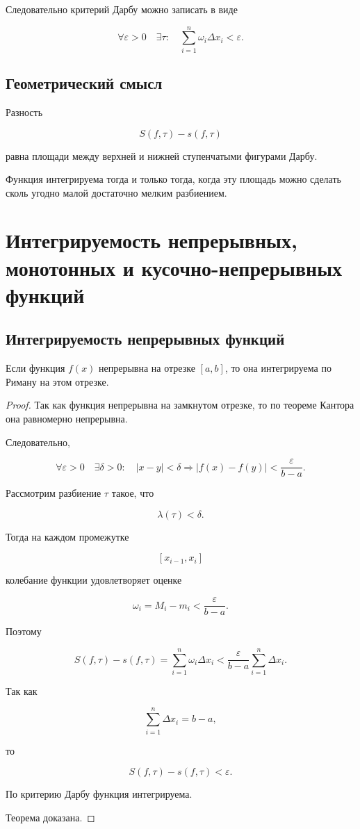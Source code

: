 \documentclass[14pt]{extreport}
\begin{document}
Следовательно критерий Дарбу можно записать в виде

\[
\forall\varepsilon>0
\quad
\exists\tau:
\quad
\sum_{i=1}^{n}
\omega_i\Delta x_i
<
\varepsilon.
\]

\section{Геометрический смысл}

Разность

\[
S(f,\tau)-s(f,\tau)
\]

равна площади между верхней и нижней ступенчатыми фигурами Дарбу.

Функция интегрируема тогда и только тогда,
когда эту площадь можно сделать сколь угодно малой
достаточно мелким разбиением.

\chapter{Интегрируемость непрерывных, монотонных и кусочно-непрерывных функций}

\section{Интегрируемость непрерывных функций}

\begin{theorem}
Если функция $f(x)$ непрерывна на отрезке $[a,b]$,
то она интегрируема по Риману на этом отрезке.
\end{theorem}

\begin{proof}

Так как функция непрерывна на замкнутом отрезке,
то по теореме Кантора она равномерно непрерывна.

Следовательно,

\[
\forall\varepsilon>0
\quad
\exists\delta>0:
\quad
|x-y|<\delta
\Rightarrow
|f(x)-f(y)|
<
\frac{\varepsilon}{b-a}.
\]

Рассмотрим разбиение $\tau$ такое, что

\[
\lambda(\tau)<\delta.
\]

Тогда на каждом промежутке

\[
[x_{i-1},x_i]
\]

колебание функции удовлетворяет оценке

\[
\omega_i
=
M_i-m_i
<
\frac{\varepsilon}{b-a}.
\]

Поэтому

\[
S(f,\tau)-s(f,\tau)
=
\sum_{i=1}^{n}
\omega_i\Delta x_i
<
\frac{\varepsilon}{b-a}
\sum_{i=1}^{n}\Delta x_i.
\]

Так как

\[
\sum_{i=1}^{n}\Delta x_i=b-a,
\]

то

\[
S(f,\tau)-s(f,\tau)
<
\varepsilon.
\]

По критерию Дарбу функция интегрируема.

Теорема доказана.
\end{proof}
\end{document}
